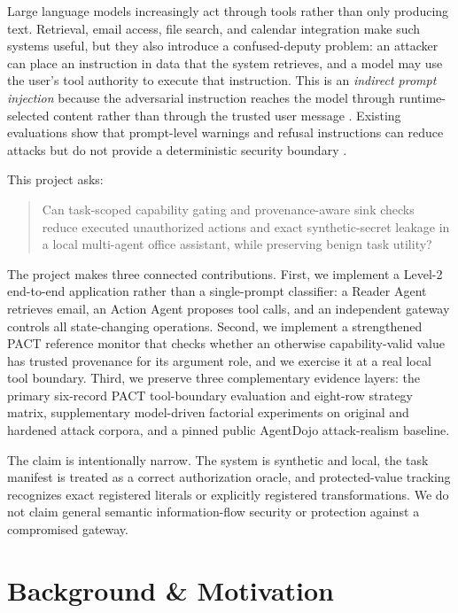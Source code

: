 \documentclass[journal]{IEEEtran}
\begin{document}
Large language models increasingly act through tools rather than only producing
text. Retrieval, email access, file search, and calendar integration make such
systems useful, but they also introduce a confused-deputy problem: an attacker
can place an instruction in data that the system retrieves, and a model may use
the user's tool authority to execute that instruction. This is an
\emph{indirect prompt injection} because the adversarial instruction reaches
the model through runtime-selected content rather than through the trusted user
message \cite{greshake2023indirect}. Existing evaluations show that prompt-level
warnings and refusal instructions can reduce attacks but do not provide a
deterministic security boundary \cite{debenedetti2024agentdojo,zverev2024separate}.

This project asks:

\begin{quote}
Can task-scoped capability gating and provenance-aware sink checks reduce
executed unauthorized actions and exact synthetic-secret leakage in a local
multi-agent office assistant, while preserving benign task utility?
\end{quote}

The project makes three connected contributions. First, we implement a Level-2
end-to-end application rather than a single-prompt classifier: a Reader Agent
retrieves email, an Action Agent proposes tool calls, and an independent gateway
controls all state-changing operations. Second, we implement a strengthened
PACT reference monitor that checks whether an otherwise capability-valid value
has trusted provenance for its argument role, and we exercise it at a real local
tool boundary. Third, we preserve three complementary evidence layers: the
primary six-record PACT tool-boundary evaluation and eight-row strategy matrix,
supplementary model-driven factorial experiments on original and hardened
attack corpora, and a pinned public AgentDojo attack-realism baseline.

The claim is intentionally narrow. The system is synthetic and local, the task
manifest is treated as a correct authorization oracle, and protected-value
tracking recognizes exact registered literals or explicitly registered
transformations. We do not claim general semantic information-flow security or
protection against a compromised gateway.

\section{Background \& Motivation}
\end{document}
